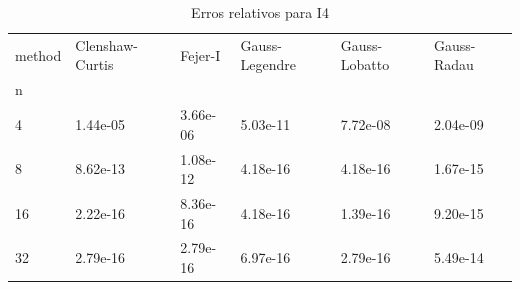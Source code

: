 \begin{table}
\centering
\caption{Erros relativos para I4}
\label{tab:errors_I4}
\begin{tabular}{llllll}
\toprule
method & Clenshaw-Curtis &   Fejer-I & Gauss-Legendre & Gauss-Lobatto & Gauss-Radau \\
n  &                 &           &                &               &             \\
\midrule
4  &        1.44e-05 &  3.66e-06 &       5.03e-11 &      7.72e-08 &    2.04e-09 \\
8  &        8.62e-13 &  1.08e-12 &       4.18e-16 &      4.18e-16 &    1.67e-15 \\
16 &        2.22e-16 &  8.36e-16 &       4.18e-16 &      1.39e-16 &    9.20e-15 \\
32 &        2.79e-16 &  2.79e-16 &       6.97e-16 &      2.79e-16 &    5.49e-14 \\
\bottomrule
\end{tabular}
\end{table}
